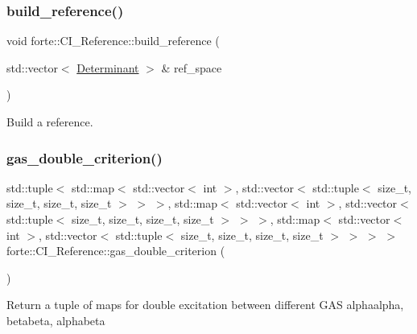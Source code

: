 \subsubsection{\texorpdfstring{build\+\_\+reference()}{build\_reference()}}
{\footnotesize\ttfamily void forte\+::\+C\+I\+\_\+\+Reference\+::build\+\_\+reference (\begin{DoxyParamCaption}\item[{std\+::vector$<$ \mbox{\hyperlink{namespaceforte_a2076c63fd7b8732004d9e1442ce527c1}{Determinant}} $>$ \&}]{ref\+\_\+space }\end{DoxyParamCaption})}



Build a reference. 

\mbox{\label{classforte_1_1_c_i___reference_a3508cacd0adb39a9b4288f9358b0f5fe}} 
\subsubsection{\texorpdfstring{gas\+\_\+double\+\_\+criterion()}{gas\_double\_criterion()}}
{\footnotesize\ttfamily std\+::tuple$<$ std\+::map$<$ std\+::vector$<$ int $>$, std\+::vector$<$ std\+::tuple$<$ size\+\_\+t, size\+\_\+t, size\+\_\+t, size\+\_\+t $>$ $>$ $>$, std\+::map$<$ std\+::vector$<$ int $>$, std\+::vector$<$ std\+::tuple$<$ size\+\_\+t, size\+\_\+t, size\+\_\+t, size\+\_\+t $>$ $>$ $>$, std\+::map$<$ std\+::vector$<$ int $>$, std\+::vector$<$ std\+::tuple$<$ size\+\_\+t, size\+\_\+t, size\+\_\+t, size\+\_\+t $>$ $>$ $>$ $>$ forte\+::\+C\+I\+\_\+\+Reference\+::gas\+\_\+double\+\_\+criterion (\begin{DoxyParamCaption}{ }\end{DoxyParamCaption})}

Return a tuple of maps for double excitation between different G\+AS alphaalpha, betabeta, alphabeta \mbox{\label{classforte_1_1_c_i___reference_a590b197025d117d464b6639379ccc831}} 
